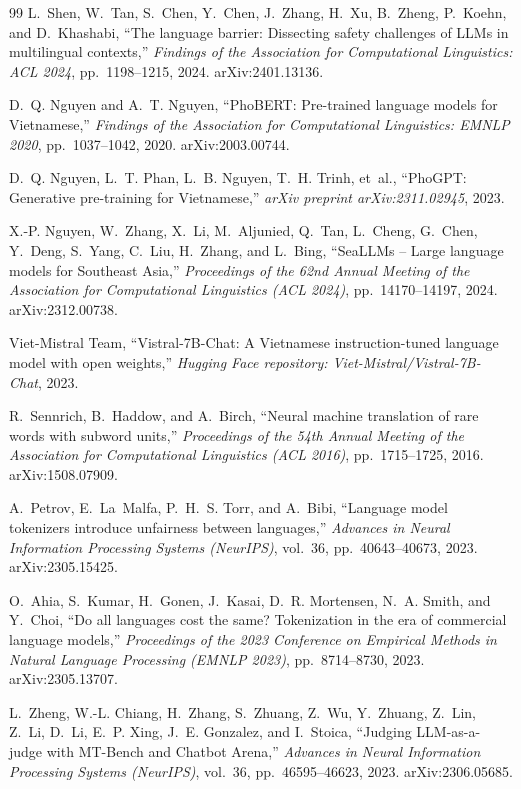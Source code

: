 \documentclass[11pt]{article}
\begin{document}
\begin{thebibliography}{99}
L.~Shen, W.~Tan, S.~Chen, Y.~Chen, J.~Zhang, H.~Xu, B.~Zheng, P.~Koehn, and D.~Khashabi,
``The language barrier: Dissecting safety challenges of {LLMs} in multilingual contexts,''
\textit{Findings of the Association for Computational Linguistics: ACL 2024}, pp.~1198--1215, 2024. arXiv:2401.13136.

D.~Q. Nguyen and A.~T. Nguyen,
``{PhoBERT}: Pre-trained language models for Vietnamese,''
\textit{Findings of the Association for Computational Linguistics: EMNLP 2020}, pp.~1037--1042, 2020. arXiv:2003.00744.

D.~Q. Nguyen, L.~T. Phan, L.~B. Nguyen, T.~H. Trinh, et~al.,
``{PhoGPT}: Generative pre-training for Vietnamese,''
\textit{arXiv preprint arXiv:2311.02945}, 2023.

X.-P. Nguyen, W.~Zhang, X.~Li, M.~Aljunied, Q.~Tan, L.~Cheng, G.~Chen, Y.~Deng, S.~Yang, C.~Liu, H.~Zhang, and L.~Bing,
``{SeaLLMs} -- Large language models for Southeast Asia,''
\textit{Proceedings of the 62nd Annual Meeting of the Association for Computational Linguistics (ACL 2024)}, pp.~14170--14197, 2024. arXiv:2312.00738.

Viet-Mistral Team,
``Vistral-7B-Chat: A Vietnamese instruction-tuned language model with open weights,''
\textit{Hugging Face repository: Viet-Mistral/Vistral-7B-Chat}, 2023.

R.~Sennrich, B.~Haddow, and A.~Birch,
``Neural machine translation of rare words with subword units,''
\textit{Proceedings of the 54th Annual Meeting of the Association for Computational Linguistics (ACL 2016)}, pp.~1715--1725, 2016. arXiv:1508.07909.

A.~Petrov, E.~La~Malfa, P.~H.~S. Torr, and A.~Bibi,
``Language model tokenizers introduce unfairness between languages,''
\textit{Advances in Neural Information Processing Systems (NeurIPS)}, vol.~36, pp.~40643--40673, 2023. arXiv:2305.15425.

O.~Ahia, S.~Kumar, H.~Gonen, J.~Kasai, D.~R. Mortensen, N.~A. Smith, and Y.~Choi,
``Do all languages cost the same? Tokenization in the era of commercial language models,''
\textit{Proceedings of the 2023 Conference on Empirical Methods in Natural Language Processing (EMNLP 2023)}, pp.~8714--8730, 2023. arXiv:2305.13707.

L.~Zheng, W.-L. Chiang, H.~Zhang, S.~Zhuang, Z.~Wu, Y.~Zhuang, Z.~Lin, Z.~Li, D.~Li, E.~P. Xing, J.~E. Gonzalez, and I.~Stoica,
``Judging {LLM}-as-a-judge with {MT-Bench} and Chatbot Arena,''
\textit{Advances in Neural Information Processing Systems (NeurIPS)}, vol.~36, pp.~46595--46623, 2023. arXiv:2306.05685.


\end{thebibliography}
\end{document}
